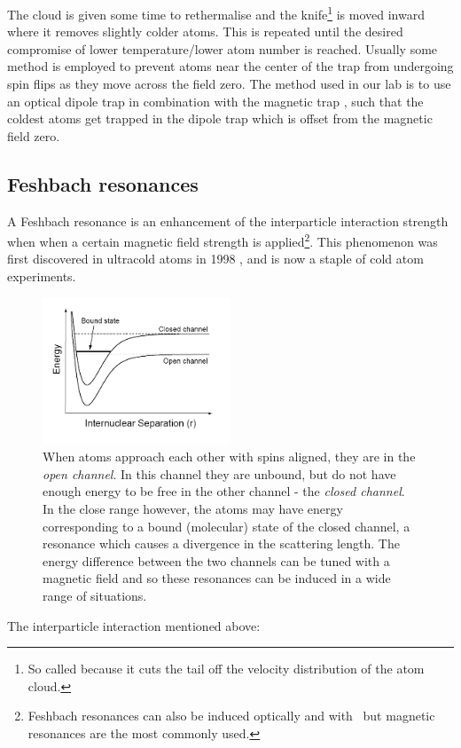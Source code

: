 The cloud is given some time to rethermalise and the knife\footnote{So called because it cuts the tail off the velocity distribution of the atom cloud.} is moved inward where it removes slightly colder atoms. This is repeated until the desired compromise of lower temperature/lower atom number is reached. Usually some method is employed to prevent atoms near the center of the trap from undergoing spin flips \cite{brink_majorana_2006} as they move across the field zero. The method used in our lab is to use an optical dipole trap in combination with the magnetic trap \cite{lin_rapid_2009}, such that the coldest atoms get trapped in the dipole trap which is offset from the magnetic field zero.

\subsection{Feshbach resonances}

A Feshbach resonance \cite{chin_feshbach_2010} is an enhancement of the interparticle interaction strength when when a certain magnetic field strength is applied\footnote{Feshbach resonances can also be induced optically and with \rf\, but magnetic resonances are the most commonly used.}. This phenomenon was first discovered in ultracold atoms in 1998 \cite{inouye_observation_1998}, and is now a staple of cold atom experiments.

\begin{figure}%
\begin{center}
\includegraphics[width=0.5\textwidth]{figures/unsorted/feshbach.png}
\caption{When atoms approach each other with spins aligned, they are in the \emph{open channel}. In this channel they are unbound, but do not have enough energy to be free in the other channel - the \emph{closed channel}. In the close range however, the atoms may have energy corresponding to a bound (molecular) state of the closed channel, a resonance which causes a divergence in the scattering length. The energy difference between the two channels can be tuned with a magnetic field and so these resonances can be induced in a wide range of situations.}\label{fig:feshbach}
\end{center}
\end{figure}
The interparticle interaction mentioned above:

